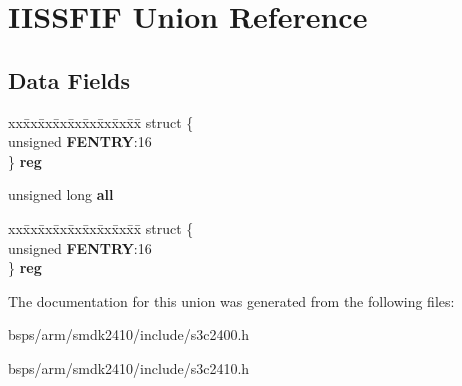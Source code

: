 \hypertarget{unionIISSFIF}{}\section{I\+I\+S\+S\+F\+IF Union Reference}
\label{unionIISSFIF}
\subsection*{Data Fields}
\begin{DoxyCompactItemize}
\item 
\mbox{\label{unionIISSFIF_a1f54e875b3e441724ed648ea1784f413}} 
\begin{tabbing}
xx\=xx\=xx\=xx\=xx\=xx\=xx\=xx\=xx\=\kill
struct \{\\
\>unsigned {\bfseries FENTRY}:16\\
\} {\bfseries reg}\\

\end{tabbing}\item 
\mbox{\label{unionIISSFIF_aa55a9a70522462dc3c31fdf359af193f}} 
unsigned long {\bfseries all}
\item 
\mbox{\label{unionIISSFIF_a0b8b1e6ffdeaeab5a629c923a3a7f302}} 
\begin{tabbing}
xx\=xx\=xx\=xx\=xx\=xx\=xx\=xx\=xx\=\kill
struct \{\\
\>unsigned {\bfseries FENTRY}:16\\
\} {\bfseries reg}\\

\end{tabbing}\end{DoxyCompactItemize}


The documentation for this union was generated from the following files\+:\begin{DoxyCompactItemize}
\item 
bsps/arm/smdk2410/include/s3c2400.\+h\item 
bsps/arm/smdk2410/include/s3c2410.\+h\end{DoxyCompactItemize}
